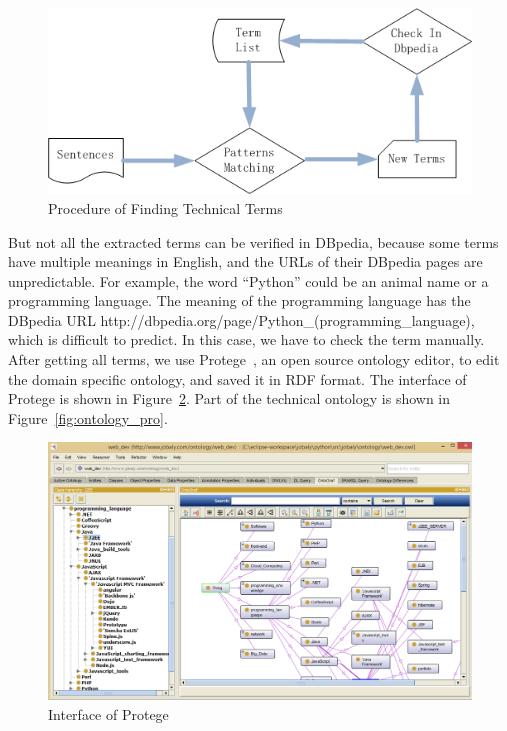 \begin{figure}[htbp]
  \includegraphics[scale=0.6]{images/genonto.png}
  \caption{Procedure of Finding Technical Terms}
  \label{fig:gen_onto}
\end{figure}

But not all the extracted terms can be verified in DBpedia, because some terms have multiple meanings in English, and the URLs of their DBpedia pages are unpredictable. For example, the word ``Python'' could be an animal name or a programming language.  The meaning of the programming language  has the DBpedia URL http://dbpedia.org/page/Python\_(programming\_language), which is difficult to predict. In this case, we have to check the term manually.  After getting all terms, we use Protege~\cite{noy2001creating}, an open source ontology editor, to edit the domain specific ontology, and saved it in RDF format. The interface of Protege is shown in Figure~\ref{fig:Protege}. Part of the technical ontology is shown in Figure~\ref{fig:ontology_pro}.


\begin{figure}[htbp]

  \includegraphics[scale=0.5]{images/protege.png}
  \caption{Interface of Protege}
  \label{fig:Protege}
\end{figure}

